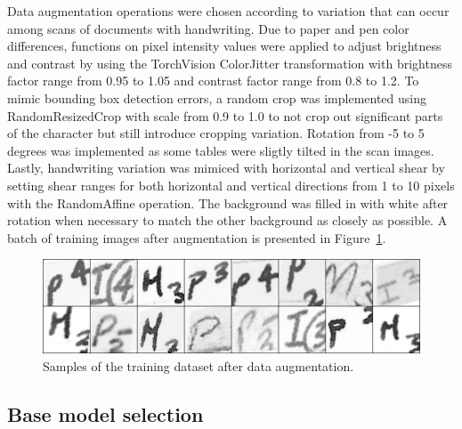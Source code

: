 \documentclass[english,twoside,openright]{UH_DS_MSc}
\begin{document}
Data augmentation operations were chosen according to variation that can 
occur among scans of documents with handwriting.
Due to paper and pen color differences, functions on pixel intensity
values were applied to adjust brightness and contrast by using the 
TorchVision ColorJitter transformation with brightness factor range from 
0.95 to 1.05 and contrast factor range from 0.8 to 1.2. To mimic bounding box detection errors, 
a random crop was implemented using RandomResizedCrop with 
scale from 0.9 to 1.0 to not crop out significant parts of the character but 
still introduce cropping variation. Rotation from -5 to 5 degrees 
was implemented as some tables were sligtly tilted in the scan images. 
Lastly, handwriting variation was mimiced with horizontal and vertical 
shear by setting shear ranges for both horizontal and vertical directions from 1 
to 10 pixels with the RandomAffine operation. The background was filled in 
with white after rotation when necessary to match the other background as closely as possible.
 A batch of training images after augmentation
is presented in Figure~\ref{image:augmented}.

\begin{figure}[h]
    \centering
    \includegraphics*[scale=.2]{images/augmented.png}
    \caption{Samples of the training dataset after data augmentation.}
    \label{image:augmented}
\end{figure}

\subsection{Base model selection}
\end{document}
